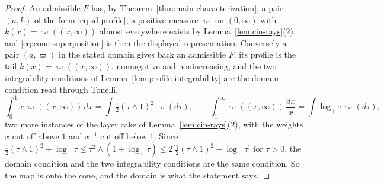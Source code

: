 \begin{proof}
An admissible $F$ has, by Theorem~\ref{thm:main-characterization}, a pair $(a,k)$ of the form
\ref{eq:sd-profile}; a positive measure $\varpi$ on $(0,\infty)$ with
$k(x) = \varpi((x,\infty))$ almost everywhere exists by Lemma~\ref{lem:cin-rays}(2), and
\ref{eq:cone-superposition} is then the displayed representation. Conversely a pair
$(a,\varpi)$ in the stated domain gives back an admissible $F$: its profile is the tail
$k(x) = \varpi((x,\infty))$, nonnegative and nonincreasing, and the two integrability
conditions of Lemma~\ref{lem:profile-integrability} are the domain condition read through
Tonelli,
\[
  \int_0^1 x\,\varpi((x,\infty))\,dx = \int \tfrac12(\tau \wedge 1)^2\,\varpi(d\tau),
  \qquad
  \int_1^\infty \varpi((x,\infty))\,\frac{dx}{x} = \int \log_+\tau\,\varpi(d\tau),
\]
two more instances of the layer cake of Lemma~\ref{lem:cin-rays}(2), with the weights $x$ cut
off above $1$ and $x^{-1}$ cut off below $1$. Since
$\tfrac12(\tau\wedge1)^2 + \log_+\tau \le \tau^2 \wedge (1 + \log_+\tau)
 \le 2\bigl[\tfrac12(\tau\wedge1)^2 + \log_+\tau\bigr]$ for $\tau > 0$, the domain condition and
the two integrability conditions are the same condition. So the map is onto the cone, and the
domain is what the statement says.


\end{proof}
